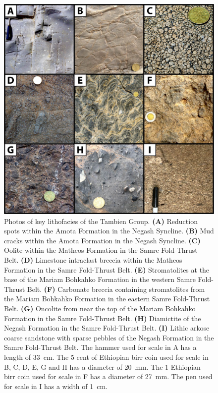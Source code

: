 \documentclass[11pt,letterpaper]{article}
\begin{document}
\begin{figure}[h!]
\begin{center}
	\includegraphics[width=5.25 in]{Figures/Lithofacies.jpg}
	\caption{Photos of key lithofacies of the Tambien Group. \textbf{(A)} Reduction spots within the Amota Formation in the Negash Syncline. \textbf{(B)} Mud cracks within the Amota Formation in the Negash Syncline. \textbf{(C)} Oolite within the Matheos Formation in the Samre Fold-Thrust Belt. \textbf{(D)} Limestone intraclast breccia within the Matheos Formation in the Samre Fold-Thrust Belt. \textbf{(E)} Stromatolites at the base of the Mariam Bohkahko Formation in the western Samre Fold-Thrust Belt. \textbf{(F)} Carbonate breccia containing stromatolites from the Mariam Bohkahko Formation in the eastern Samre Fold-Thrust Belt. \textbf{(G)} Oncolite from near the top of the Mariam Bohkahko Formation in the Samre Fold-Thrust Belt. \textbf{(H)} Diamictite of the Negash Formation in the Samre Fold-Thrust Belt. \textbf{(I)} Lithic arkose coarse sandstone with sparse pebbles of the Negash Formation in the Samre Fold-Thrust Belt. The hammer used for scale in A has a length of 33~cm. The 5 cent of Ethiopian birr coin used for scale in B, C, D, E, G and H has a diameter of 20~mm. The 1 Ethiopian birr coin used for scale in F has a diameter of 27~mm. The pen used for scale in I has a width of 1~cm.}
	\label{fig:Lithofacies}
\end{center}
\end{figure}
\end{document}
